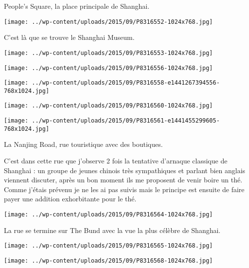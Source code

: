 \pagebreak
 People's Square, la place principale de Shanghai. 
\begin{center} \texttt{[image: ../wp-content/uploads/2015/09/P8316552-1024x768.jpg]} \end{center}

 C'est là que se trouve le Shanghai Museum.
\begin{center} \texttt{[image: ../wp-content/uploads/2015/09/P8316553-1024x768.jpg]} \end{center}
\begin{center} \texttt{[image: ../wp-content/uploads/2015/09/P8316556-1024x768.jpg]} \end{center}
\begin{center} \texttt{[image: ../wp-content/uploads/2015/09/P8316558-e1441267394556-768x1024.jpg]} \end{center}
\begin{center} \texttt{[image: ../wp-content/uploads/2015/09/P8316560-1024x768.jpg]} \end{center}
\begin{center} \texttt{[image: ../wp-content/uploads/2015/09/P8316561-e1441455299605-768x1024.jpg]} \end{center}

\pagebreak
 La Nanjing Road, rue touristique avec des boutiques. 

 C'est dans cette rue que j'observe 2 fois la tentative d'arnaque classique de Shanghai : un groupe de jeunes chinois très sympathiques et parlant bien anglais viennent discuter, après un bon moment ils me proposent de venir boire un thé. Comme j'étais prévenu je ne les ai pas suivis mais le principe est ensuite de faire payer une addition exhorbitante pour le thé. 
\begin{center} \texttt{[image: ../wp-content/uploads/2015/09/P8316564-1024x768.jpg]} \end{center}

 La rue se termine sur The Bund avec la vue la plus célèbre de Shanghai.
\begin{center} \texttt{[image: ../wp-content/uploads/2015/09/P8316565-1024x768.jpg]} \end{center}
\begin{center} \texttt{[image: ../wp-content/uploads/2015/09/P8316568-1024x768.jpg]} \end{center}

